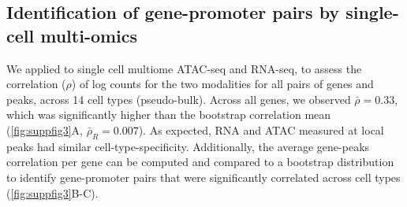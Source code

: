


\subsection{Identification of gene-promoter pairs by single-cell multi-omics}
We applied \bootranges to
single cell multiome
ATAC-seq and RNA-seq, to assess the correlation ($\rho$) of log counts for the two
modalities for all pairs of genes and peaks, across
14 cell types (pseudo-bulk). Across all genes, we observed
$\bar{\rho} = 0.33$, which was 
significantly higher than the bootstrap correlation mean
(\cref{fig:suppfig3}A, $\bar{\rho}_{R} = 0.007$). As expected, RNA
and ATAC measured at local peaks had similar cell-type-specificity.
Additionally, the average gene-peaks correlation per gene can be
computed and compared to a bootstrap distribution to
identify gene-promoter pairs that were significantly correlated across
cell types (\cref{fig:suppfig3}B-C).

